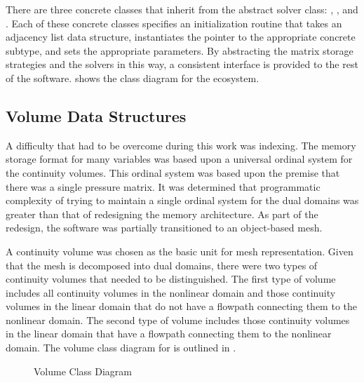 There are three concrete classes that inherit from the abstract solver class: , , and .
Each of these concrete classes specifies an initialization routine that takes an adjacency list data structure, instantiates the  pointer to the appropriate concrete subtype, and sets the appropriate parameters.
By abstracting the matrix storage strategies and the solvers in this way, a consistent interface is provided to the rest of the software.
 shows the class diagram for the  ecosystem.

\subsection{Volume Data Structures}
\label{subsect:domDecompVolumeStructs}

A difficulty that had to be overcome during this work was indexing.
The memory storage format for many variables was based upon a universal ordinal system for the continuity volumes.
This ordinal system was based upon the premise that there was a single pressure matrix.
It was determined that programmatic complexity of trying to maintain a single ordinal system for the dual domains was greater than that of redesigning the memory architecture.
As part of the redesign, the software was partially transitioned to an object-based mesh.

A continuity volume was chosen as the basic unit for mesh representation.
Given that the mesh is decomposed into dual domains, there were two types of continuity volumes that needed to be distinguished.
The first type of volume includes all continuity volumes in the nonlinear domain and those continuity volumes in the linear domain that do not have a flowpath connecting them to the nonlinear domain.
The second type of volume includes those continuity volumes in the linear domain that have a flowpath connecting them to the nonlinear domain.
The volume class diagram for \cobra{} is outlined in .

\begin{figure}[ht!]
\singlespace\centering

\caption{Volume Class Diagram}
\label{fig:volumeClassDiagram}
\end{figure}

